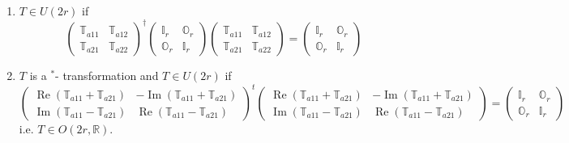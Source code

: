 \documentclass[aps, preprint]{revtex4}
\begin{document}
\begin{enumerate}
\item $T \in U \left (2 r\right )$ if
\begin{equation*}\left (\begin{array}{cc}\mathbb{T}_{a 1 1} & \mathbb{T}_{a 1 2} \\
\mathbb{T}_{a 2 1} & \mathbb{T}_{a 2 2}\end{array}\right )^{ \dag } \left (\begin{array}{cc}\mathbb{I}_{r} & \mathbb{O}_{r} \\
\mathbb{O}_{r} & \mathbb{I}_{r}\end{array}\right ) \left (\begin{array}{cc}\mathbb{T}_{a 1 1} & \mathbb{T}_{a 1 2} \\
\mathbb{T}_{a 2 1} & \mathbb{T}_{a 2 2}\end{array}\right ) =\left (\begin{array}{cc}\mathbb{I}_{r} & \mathbb{O}_{r} \\
\mathbb{O}_{r} & \mathbb{I}_{r}\end{array}\right )
\end{equation*}

\item $T$ is a $^{ \ast }$- transformation and $T \in U \left (2 r\right )$ if
\begin{equation}\left (\begin{array}{cc}\ensuremath{\operatorname*{Re}} \left (\mathbb{T}_{a 1 1} +\mathbb{T}_{a 2 1}\right ) &  -\ensuremath{\operatorname*{Im}} \left (\mathbb{T}_{a 1 1} +\mathbb{T}_{a 2 1}\right ) \\
\ensuremath{\operatorname*{Im}} \left (\mathbb{T}_{a 1 1} -\mathbb{T}_{a 2 1}\right ) & \ensuremath{\operatorname*{Re}} \left (\mathbb{T}_{a 1 1} -\mathbb{T}_{a 2 1}\right )\end{array}\right )^{t} \left (\begin{array}{cc}\ensuremath{\operatorname*{Re}} \left (\mathbb{T}_{a 1 1} +\mathbb{T}_{a 2 1}\right ) &  -\ensuremath{\operatorname*{Im}} \left (\mathbb{T}_{a 1 1} +\mathbb{T}_{a 2 1}\right ) \\
\ensuremath{\operatorname*{Im}} \left (\mathbb{T}_{a 1 1} -\mathbb{T}_{a 2 1}\right ) & \ensuremath{\operatorname*{Re}} \left (\mathbb{T}_{a 1 1} -\mathbb{T}_{a 2 1}\right )\end{array}\right ) =\left (\begin{array}{cc}\mathbb{I}_{r} & \mathbb{O}_{r} \\
\mathbb{O}_{r} & \mathbb{I}_{r}\end{array}\right )
\end{equation}i.e. $T \in O \left (2 r ,\mathbb{R}\right )\text{.}$ \end{enumerate}
\end{document}
